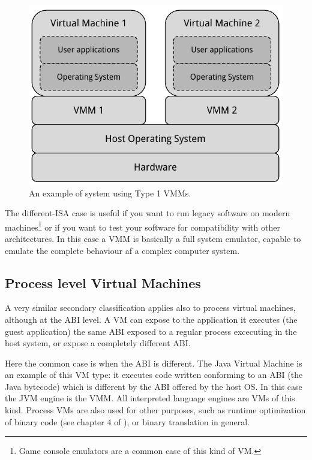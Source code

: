 \begin{figure}[bt]
\centering
\includegraphics[scale = 1.0]{type-2-vmm.pdf}
\caption{An example of system using Type 1 VMMs.}
\label{fig:t2vmm}
\end{figure}



\vspace{0.5cm}

The different-ISA case is useful if you want to run legacy software on modern machines\footnote{Game console emulators are a common case 
of this kind of VM.} or if you want to test your software for compatibility with other architectures. In this case a VMM is basically a
full system emulator, capable to emulate the complete behaviour af a complex computer system.


\subsection{Process level Virtual Machines}
A very similar secondary classification applies also to process virtual machines, although at the ABI level. A VM can expose to the
application it executes (the guest application) the same ABI exposed to a regular process excecuting in the host system, or expose a 
completely different ABI.

Here the common case is when the ABI is different. The Java Virtual Machine is an example of this VM type: it executes code written 
conforming to an ABI (the Java bytecode) which is different by the ABI offered by the host OS. In this case the JVM engine is the VMM.
All interpreted language engines are VMs of this kind. Process VMs are also used for other purposes, such as runtime optimization
of binary code (see chapter 4 of \cite{ref:vmbook}), or binary translation in general.


